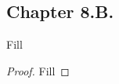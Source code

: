 \subsection*{Chapter 8.B. }


\begin{exercise}{1}
  Fill
\end{exercise}
\begin{proof}
 Fill
\end{proof}